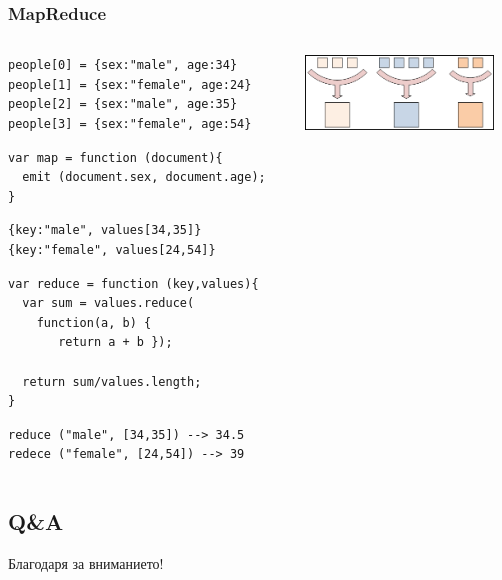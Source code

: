 \documentclass{beamer}
\begin{document}
\begin{frame}[fragile]
\frametitle{MapReduce}

\begin{columns}
  \begin{column}{0.6\textwidth}


\begin{lstlisting}
people[0] = {sex:"male", age:34}
people[1] = {sex:"female", age:24}
people[2] = {sex:"male", age:35}
people[3] = {sex:"female", age:54}
\end{lstlisting}


\vspace{0.2cm}
\pause


\begin{lstlisting}
var map = function (document){
  emit (document.sex, document.age);
}
\end{lstlisting}

\vspace{0.2cm}
\pause



\begin{lstlisting}
{key:"male", values[34,35]}
{key:"female", values[24,54]}
\end{lstlisting}




\vspace{0.2cm}
\pause

\begin{lstlisting}
var reduce = function (key,values){
  var sum = values.reduce(
    function(a, b) { 
       return a + b });

  return sum/values.length;
}
\end{lstlisting}

\vspace{0.2cm}
\pause


\begin{lstlisting}
reduce ("male", [34,35]) --> 34.5
redece ("female", [24,54]) --> 39
\end{lstlisting}



  \end{column}
  \begin{column}{0.4\textwidth}
    \includegraphics[width=5cm]{images/mapreduce}
  \end{column}
\end{columns}



\end{frame}


\subsection{Q\&A}

\begin{frame}
\centerline{Благодаря за вниманието!}
\end{frame}
\end{document}

